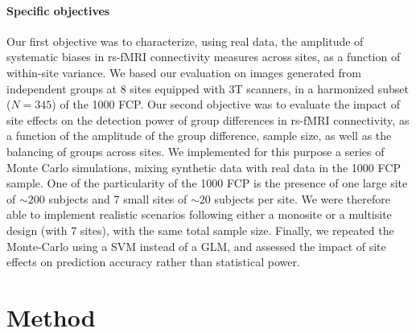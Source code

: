 \documentclass[authoryear]{elsarticle}
\begin{document}
\paragraph{Specific objectives}
Our first objective was to characterize, using real data, the amplitude of
systematic biases in rs-fMRI connectivity measures across sites, as a function
of within-site variance. We based our evaluation on images generated from
independent groups at 8 sites equipped with 3T scanners, in a harmonized subset
($N=345$) of the 1000 FCP. Our second objective was to evaluate the impact of
site effects on the detection power of group differences in rs-fMRI
connectivity, as a function of the amplitude of the group difference, sample
size, as well as the balancing of groups across sites. We implemented for this
purpose a series of Monte Carlo simulations, mixing synthetic data with real
data in the 1000 FCP sample. One of the particularity of the 1000 FCP is the presence of one large site of $\sim200$ subjects and 7 small sites of $\sim20$ subjects per site. We were therefore able to implement realistic scenarios following either a monosite or a multisite design (with 7 sites), with the same total sample size. Finally, we repeated the Monte-Carlo using a SVM instead of a GLM, and assessed the impact of site effects on prediction accuracy rather than statistical power.

\section{Method}
\end{document}
